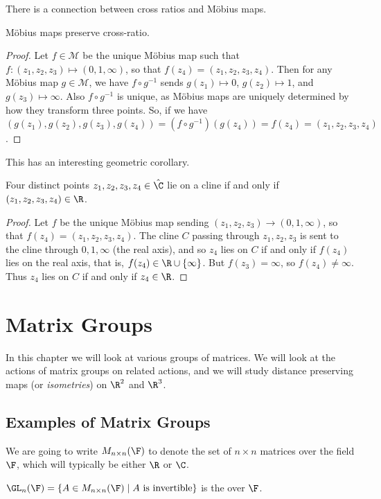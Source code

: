 \documentclass[a4]{scrreprt}
\newcommand{\newchapter}{\chapter}
\newcommand{\newsection}{\section}
\begin{document}
There is a connection between cross ratios and Möbius maps.

\begin{theorem}
	Möbius maps preserve cross-ratio.
\end{theorem}
\begin{proof}
	Let $f \in \mathcal{M}$ be the unique Möbius map such that $f:(z_1, z_2, z_3) \mapsto (0, 1, \infty)$, so that $f(z_4) = (z_1, z_2, z_3, z_4)$. Then for any Möbius map $g \in \mathcal{M}$, we have $f \circ g^{-1}$ sends $g(z_1) \mapsto 0$, $g(z_2) \mapsto 1$, and $g(z_3) \mapsto \infty$. Also $f \circ g^{-1}$ is unique, as Möbius maps are uniquely determined by how they transform three points. So, if we have $(g(z_1), g(z_2), g(z_3), g(z_4)) = (f \circ g^{-1})(g(z_4)) = f(z_4) = (z_1, z_2, z_3, z_4)$.
\end{proof}

This has an interesting geometric corollary.

\begin{theorem}
	Four distinct points $z_1, z_2, z_3, z_4 \in \hat{\C}$ lie on a cline if and only if
	$(z_1, z_2, z_3, z_4) \in \R$.
\end{theorem}
\begin{proof}
	Let $f$ be the unique Möbius map sending $(z_1, z_2, z_3) \rightarrow (0, 1, \infty)$, so that $f(z_4) = (z_1, z_2, z_3, z_4)$. The cline $C$ passing through $z_1, z_2, z_3$ is sent to the cline through $0, 1, \infty$ (the real axis), and so $z_4$ lies on $C$ if and only if $f(z_4)$ lies on the real axis, that is, $f(z_4) \in \R \cup \{\infty\}$. But $f(z_3) = \infty$, so $f(z_4) \neq \infty$. Thus $z_4$ lies on $C$ if and only if $z_4 \in \R$. 
\end{proof}

\newchapter{Matrix Groups}

In this chapter we will look at various groups of matrices. We will look at the actions of matrix groups on related actions, and we will study distance preserving maps (or \emph{isometries}) on $\R^2$ and $\R^3$.

\newsection{Examples of Matrix Groups}

We are going to write $M_{n \times n}(\F)$ to denote the set of $n \times n$ matrices over the field $\F$, which will typically be either $\R$ or $\C$.

\begin{definition}
	$\GL_n(\F) = \{A \in M_{n \times n}(\F) \mid A \text{ is invertible}\}$
 is the  over $\F$.
\end{definition}
\end{document}
